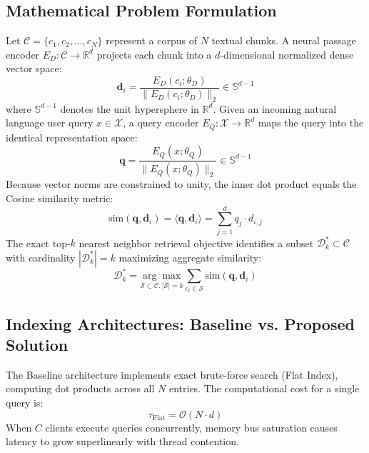 \documentclass[conference]{IEEEtran}
\begin{document}
\subsection{Mathematical Problem Formulation}
Let $\mathcal{C} = \{c_1, c_2, \dots, c_N\}$ represent a corpus of $N$ textual chunks. A neural passage encoder $E_D: \mathcal{C} \to \mathbb{R}^d$ projects each chunk into a $d$-dimensional normalized dense vector space:
\begin{equation}
\mathbf{d}_i = \frac{E_D(c_i; \theta_D)}{\|E_D(c_i; \theta_D)\|_2} \in \mathbb{S}^{d-1}
\label{eq:chunk_embed}
\end{equation}
where $\mathbb{S}^{d-1}$ denotes the unit hypersphere in $\mathbb{R}^d$. Given an incoming natural language user query $x \in \mathcal{X}$, a query encoder $E_Q: \mathcal{X} \to \mathbb{R}^d$ maps the query into the identical representation space:
\begin{equation}
\mathbf{q} = \frac{E_Q(x; \theta_Q)}{\|E_Q(x; \theta_Q)\|_2} \in \mathbb{S}^{d-1}
\label{eq:query_embed}
\end{equation}
Because vector norms are constrained to unity, the inner dot product equals the Cosine similarity metric:
\begin{equation}
\text{sim}(\mathbf{q}, \mathbf{d}_i) = \langle \mathbf{q}, \mathbf{d}_i \rangle = \sum_{j=1}^d q_j \cdot d_{i,j}
\label{eq:cosine_sim}
\end{equation}
The exact top-$k$ nearest neighbor retrieval objective identifies a subset $\mathcal{D}^*_k \subset \mathcal{C}$ with cardinality $|\mathcal{D}^*_k| = k$ maximizing aggregate similarity:
\begin{equation}
\mathcal{D}^*_k = \underset{\mathcal{S} \subset \mathcal{C}, |\mathcal{S}| = k}{\arg\max} \sum_{c_i \in \mathcal{S}} \text{sim}(\mathbf{q}, \mathbf{d}_i)
\label{eq:topk_retrieval}
\end{equation}

\subsection{Indexing Architectures: Baseline vs. Proposed Solution}
The Baseline architecture implements exact brute-force search (Flat Index), computing dot products across all $N$ entries. The computational cost for a single query is:
\begin{equation}
\tau_{\text{Flat}} = \mathcal{O}(N \cdot d)
\label{eq:flat_complexity}
\end{equation}
When $C$ clients execute queries concurrently, memory bus saturation causes latency to grow superlinearly with thread contention.
\end{document}
